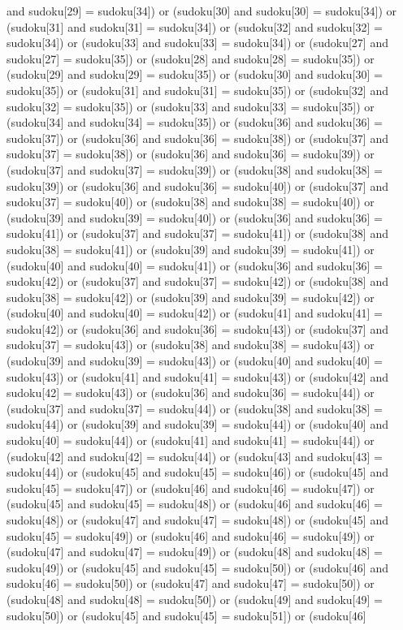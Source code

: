 \documentclass[8pt]{article}
\begin{document}
\begin{algorithm}[H]
and sudoku[29] = sudoku[34]) or (sudoku[30]  and sudoku[30] = sudoku[34]) or (sudoku[31]  and sudoku[31] = sudoku[34]) or (sudoku[32]  and sudoku[32] = sudoku[34]) or (sudoku[33]  and sudoku[33] = sudoku[34]) or (sudoku[27]  and sudoku[27] = sudoku[35]) or (sudoku[28]  and sudoku[28] = sudoku[35]) or (sudoku[29]  and sudoku[29] = sudoku[35]) or (sudoku[30]  and sudoku[30] = sudoku[35]) or (sudoku[31]  and sudoku[31] = sudoku[35]) or (sudoku[32]  and sudoku[32] = sudoku[35]) or (sudoku[33]  and sudoku[33] = sudoku[35]) or (sudoku[34]  and sudoku[34] = sudoku[35]) or (sudoku[36]  and sudoku[36] = sudoku[37]) or (sudoku[36]  and sudoku[36] = sudoku[38]) or (sudoku[37]  and sudoku[37] = sudoku[38]) or (sudoku[36]  and sudoku[36] = sudoku[39]) or (sudoku[37]  and sudoku[37] = sudoku[39]) or (sudoku[38]  and sudoku[38] = sudoku[39]) or (sudoku[36]  and sudoku[36] = sudoku[40]) or (sudoku[37]  and sudoku[37] = sudoku[40]) or (sudoku[38]  and sudoku[38] = sudoku[40]) or (sudoku[39]  and sudoku[39] = sudoku[40]) or (sudoku[36]  and sudoku[36] = sudoku[41]) or (sudoku[37]  and sudoku[37] = sudoku[41]) or (sudoku[38]  and sudoku[38] = sudoku[41]) or (sudoku[39]  and sudoku[39] = sudoku[41]) or (sudoku[40]  and sudoku[40] = sudoku[41]) or (sudoku[36]  and sudoku[36] = sudoku[42]) or (sudoku[37]  and sudoku[37] = sudoku[42]) or (sudoku[38]  and sudoku[38] = sudoku[42]) or (sudoku[39]  and sudoku[39] = sudoku[42]) or (sudoku[40]  and sudoku[40] = sudoku[42]) or (sudoku[41]  and sudoku[41] = sudoku[42]) or (sudoku[36]  and sudoku[36] = sudoku[43]) or (sudoku[37]  and sudoku[37] = sudoku[43]) or (sudoku[38]  and sudoku[38] = sudoku[43]) or (sudoku[39]  and sudoku[39] = sudoku[43]) or (sudoku[40]  and sudoku[40] = sudoku[43]) or (sudoku[41]  and sudoku[41] = sudoku[43]) or (sudoku[42]  and sudoku[42] = sudoku[43]) or (sudoku[36]  and sudoku[36] = sudoku[44]) or (sudoku[37]  and sudoku[37] = sudoku[44]) or (sudoku[38]  and sudoku[38] = sudoku[44]) or (sudoku[39]  and sudoku[39] = sudoku[44]) or (sudoku[40]  and sudoku[40] = sudoku[44]) or (sudoku[41]  and sudoku[41] = sudoku[44]) or (sudoku[42]  and sudoku[42] = sudoku[44]) or (sudoku[43]  and sudoku[43] = sudoku[44]) or (sudoku[45]  and sudoku[45] = sudoku[46]) or (sudoku[45]  and sudoku[45] = sudoku[47]) or (sudoku[46]  and sudoku[46] = sudoku[47]) or (sudoku[45]  and sudoku[45] = sudoku[48]) or (sudoku[46]  and sudoku[46] = sudoku[48]) or (sudoku[47]  and sudoku[47] = sudoku[48]) or (sudoku[45]  and sudoku[45] = sudoku[49]) or (sudoku[46]  and sudoku[46] = sudoku[49]) or (sudoku[47]  and sudoku[47] = sudoku[49]) or (sudoku[48]  and sudoku[48] = sudoku[49]) or (sudoku[45]  and sudoku[45] = sudoku[50]) or (sudoku[46]  and sudoku[46] = sudoku[50]) or (sudoku[47]  and sudoku[47] = sudoku[50]) or (sudoku[48]  and sudoku[48] = sudoku[50]) or (sudoku[49]  and sudoku[49] = sudoku[50]) or (sudoku[45]  and sudoku[45] = sudoku[51]) or (sudoku[46]  
\end{algorithm}
\end{document}
